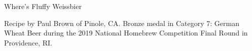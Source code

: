 \begin{recipe}{Where's Fluffy Weissbier} %

\begin{aboutblock}
Recipe by Paul Brown of Pinole, CA. Bronze medal in Category 7: German Wheat
Beer during the 2019 National Homebrew Competition Final Round in Providence, RI.
\sourceaha
\end{aboutblock}


\begin{methodandtiming}
 
\begin{mashsteps}
\end{mashsteps}

\begin{fermentationsteps}
\end{fermentationsteps}

\end{methodandtiming}

\recipebreak

\begin{ingredientsblock}

\begin{malts}
\end{malts}

\begin{hops}
\end{hops}


\end{ingredientsblock}

\end{recipe}
